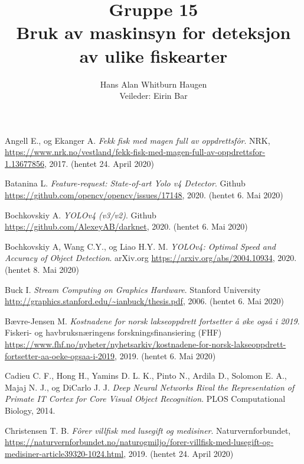 \documentclass[11ot]{article}
\title{Gruppe 15\\Bruk av maskinsyn for deteksjon av ulike fiskearter}
\author{Hans Alan Whitburn Haugen\\Veileder: Eirin Bar}
\begin{document}

\newpage

\newpage

\newpage

\newpage

\tableofcontents
\clearpage
{}
\setcounter{page}{1}








\begin{thebibliography}{9}

Angell E., og Ekanger A. 
\textit{Fekk fisk med magen full av oppdrettsfôr}. 
NRK, \url{https://www.nrk.no/vestland/fekk-fisk-med-magen-full-av-oppdrettsfor-1.13677856}, 2017. (hentet 24. April 2020)

Batanina L.
\textit{Feature-request: State-of-art Yolo v4 Detector}. 
Github \url{https://github.com/opencv/opencv/issues/17148}, 2020. (hentet 6. Mai 2020)

Bochkovskiy A.
\textit{YOLOv4 (v3/v2)}. 
Github \url{https://github.com/AlexeyAB/darknet}, 2020. (hentet 6. Mai 2020)

Bochkovskiy A, Wang C.Y., og Liao H.Y. M.
\textit{YOLOv4: Optimal Speed and Accuracy of Object Detection}. 
arXiv.org \url{https://arxiv.org/abs/2004.10934}, 2020. (hentet 8. Mai 2020)

Buck I.
\textit{Stream Computing on Graphics Hardware}. 
Stanford University \url{http://graphics.stanford.edu/~ianbuck/thesis.pdf}, 2006. (hentet 6. Mai 2020)

Bævre-Jensen M.
\textit{Kostnadene for norsk lakseoppdrett fortsetter å øke også i 2019}. 
Fiskeri- og havbruksnæringens forskningsfinansiering (FHF) \url{https://www.fhf.no/nyheter/nyhetsarkiv/kostnadene-for-norsk-lakseoppdrett-fortsetter-aa-oeke-ogsaa-i-2019}, 2019. (hentet 6. Mai 2020)

Cadieu C. F., Hong H., Yamins D. L. K., Pinto N., Ardila D., Solomon E. A., Majaj N. J., og DiCarlo J. J. 
\textit{Deep Neural Networks Rival the Representation of Primate IT Cortex for Core Visual Object Recognition}. 
PLOS Computational Biology, 2014.

Christensen T. B. 
\textit{Fôrer villfisk med lusegift og medisiner}. 
Naturvernforbundet, \url{https://naturvernforbundet.no/naturogmiljo/forer-villfisk-med-lusegift-og-medisiner-article39320-1024.html}, 2019. (hentet 24. April 2020)


\end{thebibliography}
\end{document}
